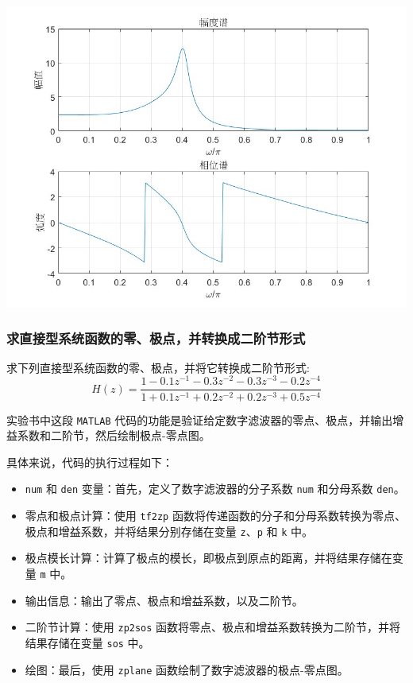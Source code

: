 \documentclass[a4paper,12pt]{article}
\begin{document}
\centering 
\includegraphics[width=0.8\linewidth]{images/3_Verify/verify1.jpg}
\justifying

\subsubsection{求直接型系统函数的零、极点，并转换成二阶节形式}
求下列直接型系统函数的零、极点，并将它转换成二阶节形式:
\[ H(z) = \frac{1 - 0.1z^{-1} - 0.3z^{-2} - 0.3z^{-3} - 0.2z^{-4}}{1 + 0.1z^{-1} + 0.2z^{-2} + 0.2z^{-3} + 0.5z^{-4}}
\]

实验书中这段 \texttt{MATLAB} 代码的功能是验证给定数字滤波器的零点、极点，并输出增益系数和二阶节，然后绘制极点-零点图。

具体来说，代码的执行过程如下：

\begin{itemize}
    \item \texttt{num} 和 \texttt{den} 变量：首先，定义了数字滤波器的分子系数 \texttt{num} 和分母系数 \texttt{den}。
    
    \item 零点和极点计算：使用 \texttt{tf2zp} 函数将传递函数的分子和分母系数转换为零点、极点和增益系数，并将结果分别存储在变量 \texttt{z}、\texttt{p} 和 \texttt{k} 中。
    
    \item 极点模长计算：计算了极点的模长，即极点到原点的距离，并将结果存储在变量 \texttt{m} 中。
    
    \item 输出信息：输出了零点、极点和增益系数，以及二阶节。
    
    \item 二阶节计算：使用 \texttt{zp2sos} 函数将零点、极点和增益系数转换为二阶节，并将结果存储在变量 \texttt{sos} 中。
    
    \item 绘图：最后，使用 \texttt{zplane} 函数绘制了数字滤波器的极点-零点图。
\end{itemize}
\end{document}
